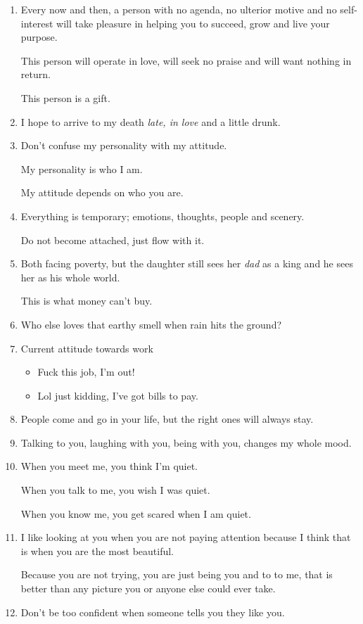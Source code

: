 \documentclass{article}
\numberwithin{equation}{section}
\begin{document}
\begin{enumerate}
    Choose wisely what you feed your mind.
    \item Every now and then, a person with no agenda, no ulterior motive and no self-interest will take pleasure in helping you to succeed, grow and live your purpose.
    
    This person will operate in love, will seek no praise and will want nothing in return.
    
    This person is a gift.
    \item I hope to arrive to my death \textit{late, in love} and a little drunk.
    \item Don't confuse my personality with my attitude.
    
    My personality is who I am.
    
    My attitude depends on who you are.
    \item Everything is temporary; emotions, thoughts, people and scenery.
    
    Do not become attached, just flow with it.
    \item Both facing poverty, but the daughter still sees her \textit{dad} as a king and he sees her as his whole world.
    
    This is what money can't buy.
    \item Who else loves that earthy smell when rain hits the ground?
    \item Current attitude towards work
    \begin{itemize}
        \item Fuck this job, I'm out!
        \item Lol just kidding, I've got bills to pay.
    \end{itemize}
    \item People come and go in your life, but the right ones will always stay.
    \item Talking to you, laughing with you, being with you, changes my whole mood.
    \item When you meet me, you think I'm quiet.
    
    When you talk to me, you wish I was quiet.
    
    When you know me, you get scared when I am quiet.
    \item I like looking at you when you are not paying attention because I think that is when you are the most beautiful.
    
    Because you are not trying, you are just being you and to to me, that is better than any picture you or anyone else could ever take.
    \item Don't be too confident when someone tells you they like you.
    

\end{enumerate}
\end{document}

